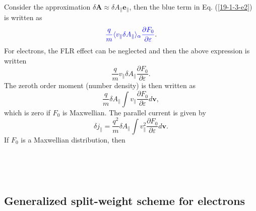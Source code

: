 \documentclass{article}
\newcommand{\tmcolor}[2]{{\color{#1}{#2}}}
\begin{document}
Consider the approximation $\delta \mathbf{A} \approx \delta A_{\parallel}
\mathbf{e}_{\parallel}$, then the blue term in Eq. (\ref{19-1-3-e2}) is
written as
\begin{equation}
  \tmcolor{blue}{\frac{q}{m} \langle v_{\parallel} \delta A_{\parallel}
  \rangle_{\alpha} \frac{\partial F_0}{\partial \varepsilon}} .
\end{equation}
For electrons, the FLR effect can be neglected and then the above expression
is written
\begin{equation}
  \frac{q}{m} v_{\parallel} \delta A_{\parallel} \frac{\partial F_0}{\partial
  \varepsilon} .
\end{equation}
The zeroth order moment (number density) is then written as
\begin{equation}
  \frac{q}{m} \delta A_{\parallel} \int v_{\parallel} \frac{\partial
  F_0}{\partial \varepsilon} d\mathbf{v},
\end{equation}
which is zero if $F_0$ is Maxwellian. The parallel current is given by
\begin{equation}
  \delta j_{\parallel} = \frac{q^2}{m} \delta A_{\parallel} \int
  v_{\parallel}^2 \frac{\partial F_0}{\partial \varepsilon} d\mathbf{v}.
\end{equation}
If $F_0$ is a Maxwellian distribution, then

\

\

\subsection{Generalized split-weight scheme for electrons}
\end{document}
